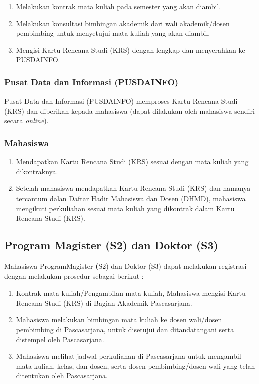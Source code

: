 \documentclass[
]{book}
\providecommand{\tightlist}{%
  \setlength{\itemsep}{0pt}\setlength{\parskip}{0pt}}
\begin{document}
\begin{enumerate}
\def\labelenumi{\arabic{enumi}.}
\tightlist
\item
  Melakukan kontrak mata kuliah pada semester yang akan diambil.
\item
  Melakukan konsultasi bimbingan akademik dari wali akademik/dosen pembimbing untuk menyetujui mata kuliah yang akan diambil.
\item
  Mengisi Kartu Rencana Studi (KRS) dengan lengkap dan menyerahkan ke PUSDAINFO.
\end{enumerate}

\hypertarget{pusat-data-dan-informasi-pusdainfo}{%
\subsubsection{Pusat Data dan Informasi (PUSDAINFO)}\label{pusat-data-dan-informasi-pusdainfo}}

Pusat Data dan Informasi (PUSDAINFO) memproses Kartu Rencana Studi (KRS) dan diberikan kepada mahasiswa (dapat dilakukan oleh mahasiswa sendiri secara \emph{online}).

\hypertarget{mahasiswa-1}{%
\subsubsection{Mahasiswa}\label{mahasiswa-1}}

\begin{enumerate}
\def\labelenumi{\arabic{enumi}.}
\tightlist
\item
  Mendapatkan Kartu Rencana Studi (KRS) sesuai dengan mata kuliah yang dikontraknya.
\item
  Setelah mahasiswa mendapatkan Kartu Rencana Studi (KRS) dan namanya tercantum dalan Daftar Hadir Mahasiswa dan Dosen (DHMD), mahasiswa mengikuti perkuliahan sesuai mata kuliah yang dikontrak dalam Kartu Rencana Studi (KRS).
\end{enumerate}

\hypertarget{program-magister-s2-dan-doktor-s3}{%
\subsection{Program Magister (S2) dan Doktor (S3)}\label{program-magister-s2-dan-doktor-s3}}

Mahasiswa ProgramMagister \textbf{(}S2) dan Doktor (S3) dapat melakukan registrasi dengan melakukan prosedur sebagai berikut :

\begin{enumerate}
\def\labelenumi{\arabic{enumi}.}
\tightlist
\item
  Kontrak mata kuliah/Pengambilan mata kuliah, Mahasiswa mengisi Kartu Rencana Studi (KRS) di Bagian Akademik Pascasarjana.
\item
  Mahasiswa melakukan bimbingan mata kuliah ke dosen wali/dosen pembimbing di Pascasarjana, untuk disetujui dan ditandatangani serta distempel oleh Pascasarjana.
\item
  Mahasiswa melihat jadwal perkuliahan di Pascasarjana untuk mengambil mata kuliah, kelas, dan dosen, serta dosen pembimbing/dosen wali yang telah ditentukan oleh Pascasarjana.
\end{enumerate}
\end{document}
